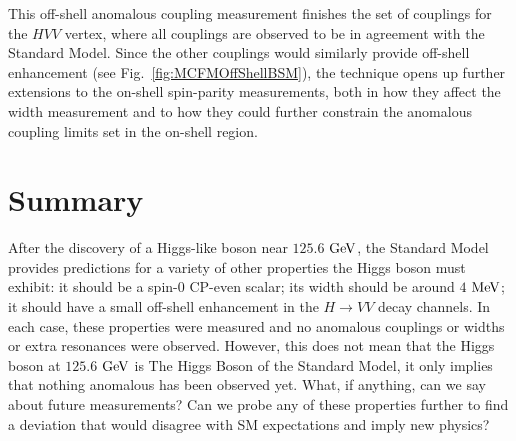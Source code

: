 This off-shell anomalous coupling measurement finishes the set of couplings for the $HVV$ vertex, where all couplings are observed to be in agreement with the Standard Model. Since the other couplings would similarly provide off-shell enhancement (see Fig.~\ref{fig:MCFMOffShellBSM}), the technique opens up further extensions to the on-shell spin-parity measurements, both in how they affect the width measurement and to how they could further constrain the anomalous coupling limits set in the on-shell region.

\section{Summary}
\label{sec:properties_summary}

After the discovery of a Higgs-like boson near $125.6$ $\rm{GeV}$, the Standard Model provides predictions for a variety of other properties the Higgs boson must exhibit: it should be a spin-0 CP-even scalar; its width should be around $4$ $\rm{MeV}$; it should have a small off-shell enhancement in the $H\rightarrow VV$ decay channels. In each case, these properties were measured and no anomalous couplings or widths or extra resonances were observed. However, this does not mean that the Higgs boson at $125.6$ $\rm{GeV}$ is The Higgs Boson of the Standard Model, it only implies that nothing anomalous has been observed yet. What, if anything, can we say about future measurements? Can we probe any of these properties further to find a deviation that would disagree with SM expectations and imply new physics?
